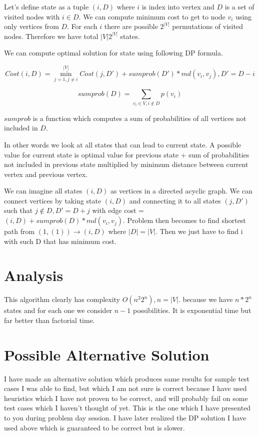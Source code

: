 \documentclass[11pt]{article}
\begin{document}
Let's define state as a tuple $(i,D)$ where $i$ is index into vertex and $D$ is a set of visited nodes with $i\in D$.  We can compute minimum cost to get to node $v_{i}$ using only vertices from $D$.  For each $i$ there are possible $2^{|V|}$ permutations of visited nodes.  Therefore we have total $|V|2^{|V|}$ states.

We can compute optimal solution for state using following DP formula.

$$Cost(i,D) = \min_{j=1, j\neq i}^{|V|} Cost(j,D') + sumprob(D')*md(v_{i},v_{j}), D' = D-i$$

$$sumprob(D) = \sum_{v_{i}\in V, i\notin D } p(v_{i})$$

$sumprob$ is a function which computes a sum of probabilities of all vertices not included in $D$.

In other words we look at all states that can lead to current state.  A possible value for current state is optimal value for previous state + sum of probabilities not included in previous state multiplied by minimum distance between current vertex and previous vertex.

We can imagine all states $(i,D)$ as vertices in a directed acyclic graph.  We can connect vertices by taking state $(i,D)$ and connecting it to all states $(j,D')$ such that $j\notin D, D' = D + j$ with edge cost = $(i,D)+sumprob(D)*md(v_{i},v_{j})$.  Problem then becomes to find shortest path from $(1,(1)) \to (i,D)$ where $|D| = |V|$.  Then we just have to find i with such D that has minimum cost.

\section{Analysis}

This algorithm clearly has complexity $O(n^{2}2^{n}), n = |V|$. because we have $n*2^n$ states and for each one we consider $n-1$ possibilities.  It is exponential time but far better than factorial time.  

\section{Possible Alternative Solution}

I have made an alternative solution which produces same results for sample test cases I was able to find, but which I am not sure is correct because I have used heuristics which I have not proven to be correct, and will probably fail on some test cases which I haven't thought of yet.  This is the one which I have presented to you during problem day session.  I have later realized the DP solution I have used above which is guaranteed to be correct but is slower.
\end{document}
